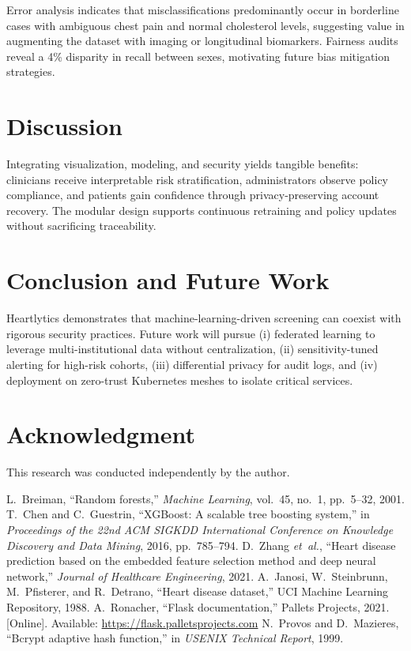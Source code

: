 \documentclass[conference]{IEEEtran}
\begin{document}
Error analysis indicates that misclassifications predominantly occur in borderline cases with ambiguous chest pain and normal cholesterol levels, suggesting value in augmenting the dataset with imaging or longitudinal biomarkers. Fairness audits reveal a 4\% disparity in recall between sexes, motivating future bias mitigation strategies.

\section{Discussion}
Integrating visualization, modeling, and security yields tangible benefits: clinicians receive interpretable risk stratification, administrators observe policy compliance, and patients gain confidence through privacy-preserving account recovery. The modular design supports continuous retraining and policy updates without sacrificing traceability.

\section{Conclusion and Future Work}
Heartlytics demonstrates that machine-learning-driven screening can coexist with rigorous security practices. Future work will pursue (i) federated learning to leverage multi-institutional data without centralization, (ii) sensitivity-tuned alerting for high-risk cohorts, (iii) differential privacy for audit logs, and (iv) deployment on zero-trust Kubernetes meshes to isolate critical services.

\section*{Acknowledgment}
This research was conducted independently by the author.

\begin{thebibliography}{1}
 L.~Breiman, ``Random forests,'' \emph{Machine Learning}, vol.~45, no.~1, pp.~5--32, 2001.
 T.~Chen and C.~Guestrin, ``XGBoost: A scalable tree boosting system,'' in \emph{Proceedings of the 22nd ACM SIGKDD International Conference on Knowledge Discovery and Data Mining}, 2016, pp.~785--794.
 D.~Zhang \emph{et~al.}, ``Heart disease prediction based on the embedded feature selection method and deep neural network,'' \emph{Journal of Healthcare Engineering}, 2021.
 A.~Janosi, W.~Steinbrunn, M.~Pfisterer, and R.~Detrano, ``Heart disease dataset,'' UCI Machine Learning Repository, 1988.
 A.~Ronacher, ``Flask documentation,'' Pallets Projects, 2021. [Online]. Available: \url{https://flask.palletsprojects.com}
 N.~Provos and D.~Mazieres, ``Bcrypt adaptive hash function,'' in \emph{USENIX Technical Report}, 1999.
\end{thebibliography}
\end{document}
